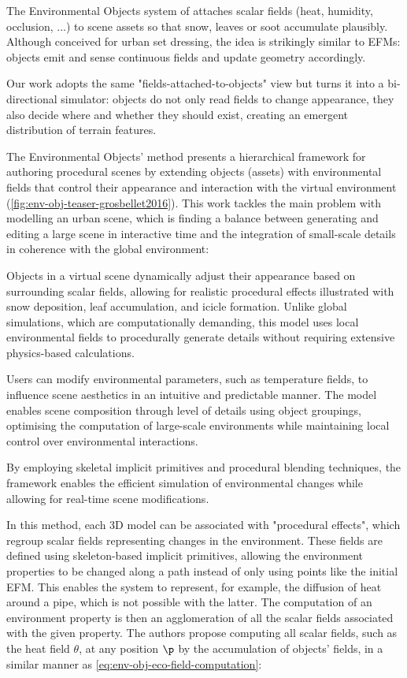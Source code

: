 The Environmental Objects system of \citep{Grosbellet2016} attaches scalar fields (heat, humidity, occlusion, ...) to scene assets so that snow, leaves or soot accumulate plausibly. Although conceived for urban set dressing, the idea is strikingly similar to EFMs: objects emit and sense continuous fields and update geometry accordingly.

Our work adopts the same "fields-attached-to-objects" view but turns it into a bi-directional simulator: objects do not only read fields to change appearance, they also decide where and whether they should exist, creating an emergent distribution of terrain features.

The Environmental Objects' method presents a hierarchical framework for authoring procedural scenes by extending objects (assets) with environmental fields that control their appearance and interaction with the virtual environment (\cref{fig:env-obj-teaser-grosbellet2016}). This work tackles the main problem with modelling an urban scene, which is finding a balance between generating and editing a large scene in interactive time and the integration of small-scale details in coherence with the global environment:
\begin{Itemize}
    \Item{} Objects in a virtual scene dynamically adjust their appearance based on surrounding scalar fields, allowing for realistic procedural effects illustrated with snow deposition, leaf accumulation, and icicle formation. Unlike global simulations, which are computationally demanding, this model uses local environmental fields to procedurally generate details without requiring extensive physics-based calculations.

    \Item{} Users can modify environmental parameters, such as temperature fields, to influence scene aesthetics in an intuitive and predictable manner. The model enables scene composition through level of details using object groupings, optimising the computation of large-scale environments while maintaining local control over environmental interactions.
\end{Itemize}
By employing skeletal implicit primitives and procedural blending techniques, the framework enables the efficient simulation of environmental changes while allowing for real-time scene modifications.

In this method, each 3D model can be associated with "procedural effects", which regroup scalar fields representing changes in the environment. These fields are defined using skeleton-based implicit primitives, allowing the environment properties to be changed along a path instead of only using points like the initial EFM. This enables the system to represent, for example, the diffusion of heat around a pipe, which is not possible with the latter. The computation of an environment property is then an agglomeration of all the scalar fields associated with the given property. The authors propose computing all scalar fields, such as the heat field $\theta$, at any position $\p$ by the accumulation of objects' fields, in a similar manner as \cref{eq:env-obj-eco-field-computation}:

